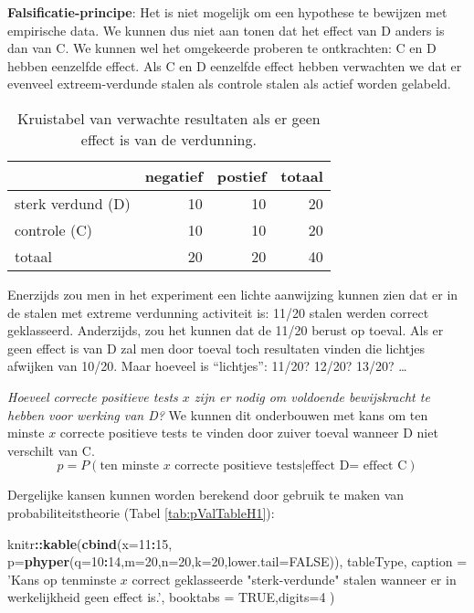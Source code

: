 \documentclass[12pt,dutch,coursenotes]{book}
\newenvironment{Shaded}{\begin{snugshade}}{\end{snugshade}}
\newcommand{\KeywordTok}[1]{\textcolor[rgb]{0.13,0.29,0.53}{\textbf{#1}}}
\newcommand{\DataTypeTok}[1]{\textcolor[rgb]{0.13,0.29,0.53}{#1}}
\newcommand{\DecValTok}[1]{\textcolor[rgb]{0.00,0.00,0.81}{#1}}
\newcommand{\StringTok}[1]{\textcolor[rgb]{0.31,0.60,0.02}{#1}}
\newcommand{\OtherTok}[1]{\textcolor[rgb]{0.56,0.35,0.01}{#1}}
\newcommand{\OperatorTok}[1]{\textcolor[rgb]{0.81,0.36,0.00}{\textbf{#1}}}
\newcommand{\NormalTok}[1]{#1}
\theoremstyle{definition}
\theoremstyle{definition}
\theoremstyle{definition}
\theoremstyle{remark}
\begin{document}
\textbf{Falsificatie-principe}: Het is niet mogelijk om een hypothese te
bewijzen met empirische data. We kunnen dus niet aan tonen dat het
effect van D anders is dan van C. We kunnen wel het omgekeerde proberen
te ontkrachten: C en D hebben eenzelfde effect. Als C en D eenzelfde
effect hebben verwachten we dat er evenveel extreem-verdunde stalen als
controle stalen als actief worden gelabeld.

\begin{table}

\caption{\label{tab:kruistabelTheo}Kruistabel van verwachte resultaten als er geen effect is van de verdunning.}
\centering
\begin{tabular}[t]{lrrr}
\toprule
  & negatief & postief & totaal\\
\midrule
sterk verdund (D) & 10 & 10 & 20\\
controle (C) & 10 & 10 & 20\\
totaal & 20 & 20 & 40\\
\bottomrule
\end{tabular}
\end{table}

Enerzijds zou men in het experiment een lichte aanwijzing kunnen zien
dat er in de stalen met extreme verdunning activiteit is: 11/20 stalen
werden correct geklasseerd. Anderzijds, zou het kunnen dat de 11/20
berust op toeval. Als er geen effect is van D zal men door toeval toch
resultaten vinden die lichtjes afwijken van 10/20. Maar hoeveel is
``lichtjes'': 11/20? 12/20? 13/20? \ldots{}

\emph{Hoeveel correcte positieve tests \(x\) zijn er nodig om voldoende
bewijskracht te hebben voor werking van D?} We kunnen dit onderbouwen
met kans om ten minste \(x\) correcte positieve tests te vinden door
zuiver toeval wanneer D niet verschilt van C.
\[p=P(\text{ten minste } x \text{ correcte positieve tests} \vert \text{effect D= effect C})\]

Dergelijke kansen kunnen worden berekend door gebruik te maken van
probabiliteitstheorie (Tabel \ref{tab:pValTableH1}):

\begin{Shaded}
\begin{Highlighting}[]
\NormalTok{knitr}\OperatorTok{::}\KeywordTok{kable}\NormalTok{(}\KeywordTok{cbind}\NormalTok{(}\DataTypeTok{x=}\DecValTok{11}\OperatorTok{:}\DecValTok{15}\NormalTok{,}
  \DataTypeTok{p=}\KeywordTok{phyper}\NormalTok{(}\DataTypeTok{q=}\DecValTok{10}\OperatorTok{:}\DecValTok{14}\NormalTok{,}\DataTypeTok{m=}\DecValTok{20}\NormalTok{,}\DataTypeTok{n=}\DecValTok{20}\NormalTok{,}\DataTypeTok{k=}\DecValTok{20}\NormalTok{,}\DataTypeTok{lower.tail=}\OtherTok{FALSE}\NormalTok{)), tableType,}
  \DataTypeTok{caption =} \StringTok{'Kans op tenminste $x$ correct geklasseerde "sterk-verdunde" stalen wanneer er in werkelijkheid geen effect is.'}\NormalTok{,}
  \DataTypeTok{booktabs =} \OtherTok{TRUE}\NormalTok{,}\DataTypeTok{digits=}\DecValTok{4}
\NormalTok{)}
\end{Highlighting}
\end{Shaded}
\end{document}
